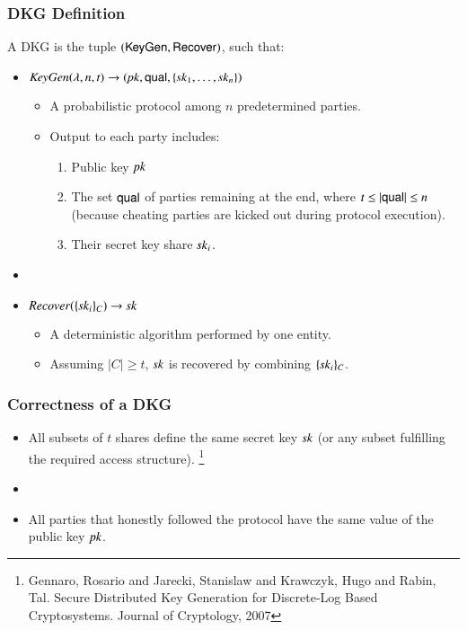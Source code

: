 \documentclass[hyperref={pdfpagelabels=true},table,dvipsnames,14pt,aspectratio=169]{beamer}
\begin{document}
\begin{frame}
  \frametitle{DKG Definition}

  A DKG is the tuple $(\mathsf{KeyGen}, \mathsf{Recover})$, such that:

  \begin{itemize}
    \item<2-> $\mathit{KeyGen}(\lambda, n, t) \rightarrow ( \mathit{pk}, \mathsf{qual}, \{\mathit{sk}_1, \ldots, \mathit{sk}_n \} )$
    \begin{itemize}
      \item<3-> A probabilistic protocol among $n$ predetermined parties.
      \item<4-> Output to each party includes:
    \begin{enumerate}
      \item<5->[1.] Public key $\mathit{pk}$
      \item<6->[2.] The set $\mathsf{qual}$ of parties remaining at the end, where $t \leq \lvert \mathsf{qual} \rvert \leq n$ (because cheating parties are kicked out during protocol execution).
      \item<7->[3.] Their secret key share $\mathit{sk}_i$.
    \end{enumerate}

    \end{itemize}
    \item[]
    \item<8-> $\mathit{Recover}(\{ \mathit{sk}_i \}_C) \rightarrow \mathit{sk}$
    \begin{itemize}
      \item<9-> A deterministic algorithm performed by one entity.
      \item<10-> Assuming $\lvert C \rvert \geq t$, $\mathit{sk}$ is recovered by combining $\{ \mathit{sk}_i \}_C$.
    \end{itemize}
  \end{itemize}
\end{frame}

\begin{frame}
  \frametitle{Correctness of a DKG}

  \begin{itemize}
    \item<1-> All subsets of $t$ shares define the same secret key $\mathit{sk}$ (or any subset fulfilling the required access structure).
\let\thefootnote\relax\footnote{
Gennaro, Rosario and Jarecki, Stanislaw and Krawczyk, Hugo and Rabin, Tal. Secure Distributed Key Generation for Discrete-Log Based Cryptosystems. Journal of Cryptology, 2007
}
    \item[]
    \item<2-> All parties that honestly followed the protocol have the same value of the public key $\mathit{pk}$.
  \end{itemize}
\end{frame}
\end{document}
